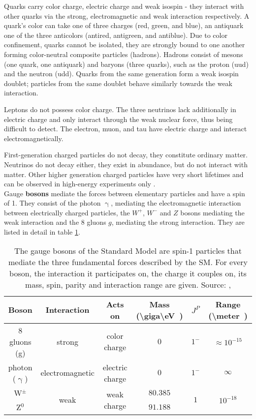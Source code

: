Quarks carry color charge, electric charge and weak isospin - they interact with other quarks via the strong, electromagnetic and weak interaction respectively. A quark's color can take one of three charges (red, green, and blue), an antiquark one of the three anticolors (antired, antigreen, and antiblue). Due to color confinement, quarks cannot be isolated, they are strongly bound to one another forming color-neutral composite particles (hadrons). Hadrons consist of mesons (one quark, one antiquark) and baryons (three quarks), such as the proton (uud) and the neutron (udd). Quarks from the same generation form a weak isospin doublet; particles from the same doublet behave similarly towards the weak interaction.

Leptons do not possess color charge. The three neutrinos lack additionally in electric charge and only interact through the weak nuclear force, thus being difficult to detect. The electron, muon, and tau have electric charge and interact electromagnetically.

First-generation charged particles do not decay, they constitute ordinary matter. Neutrinos do not decay either, they exist in abundance, but do not interact with matter. Other higher generation charged particles have very short lifetimes and can be observed in high-energy experiments only \cite{wiki:standardmodel}.\\

Gauge \textbf{bosons} mediate the forces between elementary particles and have a spin of 1. They consist of the photon $\upgamma$, mediating the electromagnetic interaction between electrically charged particles, the $W^{+}$, $W^{-}$ and $Z$ bosons mediating the weak interaction and the 8 gluons $g$, mediating the strong interaction. They are listed in detail in table \ref{tab:ch_1_sm_bosons}.\\

\begin{table}[h]
	\caption[Gauge bosons of the Standard Model]{The gauge bosons of the Standard Model are spin-1 particles that mediate the three fundamental forces described by the SM. For every boson, the interaction it participates on, the charge it couples on, its mass, spin, parity and interaction range are given. Source: \cite{povh}, \cite{faltermann}}
	\label{tab:ch_1_sm_bosons}
	\begin{tabular}{cccccc}
		\toprule
		Boson & Interaction & Acts on & Mass (\SI[parse-numbers = false]{\giga\eV}) & {$J^P$} & Range (\SI[parse-numbers = false]{\meter})\\
		\midrule
		8 gluons (g) & strong & color charge & {$0$} & {$1^-$} & $\approx 10^{-15}$\\
		photon ($\upgamma$) & electromagnetic & electric charge & {$0$} & {$1^-$} & {$\infty$}\\
		W$^{\pm}$ & \multirow{2}{*}{weak} &\multirow{2}{*}{weak charge} & {$80.385$} & \multirow{2}{*}{$1$} & \multirow{2}{*}{$10^{-18}$}\\
		Z$^0$ & & & {$91.188$} & &\\
		\bottomrule
	\end{tabular}
\end{table}

